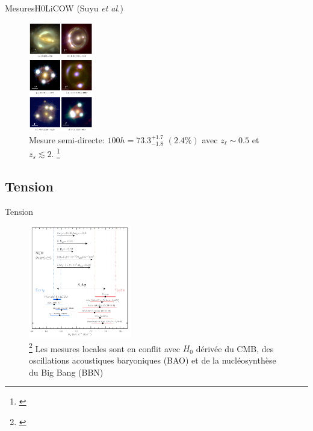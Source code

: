 \documentclass{beamer}
\begin{document}
\begin{frame}{Mesures}{H0LiCOW (Suyu \textit{et al.})}
        \begin{figure}[H]
                \centering
                \includegraphics[width=0.25\textwidth]{holicow_lens}
                \caption{Mesure semi-directe: 
                $\boxed{100h = 73.3^{+1.7}_{-1.8}\,\,(2.4\%)}$ avec 
                        $z_\ell \sim 0.5$ et $z_s \lesssim 2$.
                \footnote{\citet{Wong2020}}}
        \end{figure}
\end{frame}

\subsection{Tension}
\begin{frame}{Tension}
        \begin{figure}[H]
                \centering
                \includegraphics[width=0.4\textwidth]{H0_tension_Sh0es2019}
                \caption{
                        \footnote{\citet{Riess2019}}
                        Les mesures locales sont en conflit avec $H_0$ dérivée du CMB, 
                des oscillations acoustiques baryoniques (BAO) et de la nucléosynthèse 
        du Big Bang (BBN)}
        \end{figure}
         
\end{frame}
\end{document}
